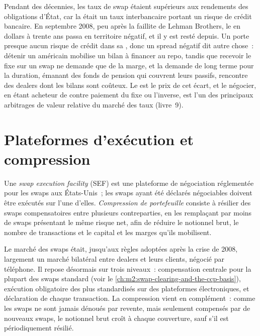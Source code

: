 Pendant des décennies, les taux de swap étaient supérieurs aux rendements des obligations d'État, car la 
était un taux interbancaire portant un risque de crédit bancaire. En septembre 2008, peu
après la faillite de Lehman Brothers, le  en dollars à trente ans passa
en territoire négatif, et il y est resté depuis. Un  porte
presque aucun risque de crédit dans sa , donc un spread négatif dit
autre chose~: détenir un  américain mobilise un bilan à financer au repo,
tandis que recevoir le fixe sur un swap ne demande que de la marge, et la demande de long terme pour
la duration, émanant des fonds de pension qui couvrent leurs passifs, rencontre des dealers dont
les bilans sont coûteux. Le  est le prix de cet écart,
et le négocier, en étant acheteur de  contre paiement du fixe ou l'inverse, est
l'un des principaux arbitrages de valeur relative du marché des taux (livre~9).

\section{Plateformes d'exécution et compression}

\begin{definition}\label{def:m2:interest-rate-swaps:sef}
Une \emph{swap execution facility} (SEF) est une
plateforme de négociation réglementée pour les swaps aux États-Unis~; les swaps ayant
été déclarés négociables doivent être exécutés sur l'une d'elles. \emph{Compression
de portefeuille} consiste à résilier des swaps compensatoires
entre plusieurs contreparties, en les remplaçant par moins de swaps présentant le même
risque net, afin de réduire le notionnel brut, le nombre de transactions et le capital
et les marges qu'ils mobilisent.
\end{definition}

Le marché des swaps était, jusqu'aux règles adoptées après la crise de 2008, largement un
marché bilatéral entre dealers et leurs clients, négocié par téléphone. Il repose désormais sur trois niveaux~:
compensation centrale pour la plupart des swaps standard (voir le \cref{ch:m2:swap-clearing-and-the-ccp-basis}),
exécution obligatoire des plus standardisés sur des plateformes électroniques, et
déclaration de chaque transaction. La compression vient en complément~: comme les swaps ne sont jamais
dénoués par revente, mais seulement compensés par de nouveaux swaps, le notionnel brut croît
à chaque couverture, sauf s'il est périodiquement résilié.

